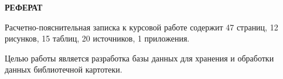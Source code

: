 \begin{center}
	\textbf{РЕФЕРАТ}
\end{center}

Расчетно-пояснительная записка к курсовой работе содержит 47 страниц, 12 рисунков, 15 таблиц, 20 источников, 1 приложения.

Целью работы является разработка базы данных для хранения и обработки данных библиотечной картотеки.